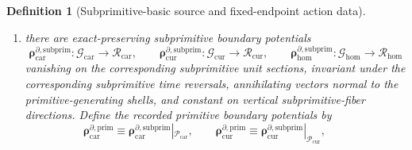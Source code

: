 \documentclass[11pt]{article}
\newcommand{\TensorDensityClass}{\mathscr N_{\mathrm{car}}}
\newcommand{\CurDensityClass}{\mathscr N_{\mathrm{cur}}}
\newcommand{\HomDensityClass}{\mathscr N_{\mathrm{hom}}}
\newcommand{\TensorFluxClass}{\mathscr J_{\mathrm{car}}}
\newcommand{\CurFluxClass}{\mathscr J_{\mathrm{cur}}}
\newcommand{\HomFluxClass}{\mathscr J_{\mathrm{hom}}}
\newcommand{\TensorPhaseReadClass}{\mathscr R_{\mathrm{car}}}
\newcommand{\CurPhaseReadClass}{\mathscr R_{\mathrm{cur}}}
\newcommand{\HomPhaseReadClass}{\mathscr R_{\mathrm{hom}}}
\newcommand{\TensorPrimitiveSpace}{\mathcal P_{\mathrm{car}}}
\newcommand{\CurPrimitiveSpace}{\mathcal P_{\mathrm{cur}}}
\newcommand{\HomPrimitiveSpace}{\mathcal P_{\mathrm{hom}}}
\newcommand{\TensorPrimitiveDensitySource}{\boldsymbol{q}_{\mathrm{car}}^{\mathrm{prim}}}
\newcommand{\CurPrimitiveDensitySource}{\boldsymbol{q}_{\mathrm{cur}}^{\mathrm{prim}}}
\newcommand{\HomPrimitiveDensitySource}{\boldsymbol{q}_{\mathrm{hom}}^{\mathrm{prim}}}
\newcommand{\TensorPrimitiveFluxSource}{\boldsymbol{j}_{\mathrm{car}}^{\mathrm{prim}}}
\newcommand{\CurPrimitiveFluxSource}{\boldsymbol{j}_{\mathrm{cur}}^{\mathrm{prim}}}
\newcommand{\HomPrimitiveFluxSource}{\boldsymbol{j}_{\mathrm{hom}}^{\mathrm{prim}}}
\newcommand{\TensorPrimitiveBoundarySource}{\boldsymbol{\rho}_{\mathrm{car}}^{\partial,\mathrm{prim}}}
\newcommand{\CurPrimitiveBoundarySource}{\boldsymbol{\rho}_{\mathrm{cur}}^{\partial,\mathrm{prim}}}
\newcommand{\TensorSubprimitiveSpace}{\mathcal G_{\mathrm{car}}}
\newcommand{\CurSubprimitiveSpace}{\mathcal G_{\mathrm{cur}}}
\newcommand{\HomSubprimitiveSpace}{\mathcal G_{\mathrm{hom}}}
\newcommand{\TensorSubprimitiveDensitySource}{\boldsymbol{q}_{\mathrm{car}}^{\mathrm{subprim}}}
\newcommand{\CurSubprimitiveDensitySource}{\boldsymbol{q}_{\mathrm{cur}}^{\mathrm{subprim}}}
\newcommand{\HomSubprimitiveDensitySource}{\boldsymbol{q}_{\mathrm{hom}}^{\mathrm{subprim}}}
\newcommand{\TensorSubprimitiveFluxSource}{\boldsymbol{j}_{\mathrm{car}}^{\mathrm{subprim}}}
\newcommand{\CurSubprimitiveFluxSource}{\boldsymbol{j}_{\mathrm{cur}}^{\mathrm{subprim}}}
\newcommand{\HomSubprimitiveFluxSource}{\boldsymbol{j}_{\mathrm{hom}}^{\mathrm{subprim}}}
\newcommand{\TensorSubprimitiveBoundarySource}{\boldsymbol{\rho}_{\mathrm{car}}^{\partial,\mathrm{subprim}}}
\newcommand{\CurSubprimitiveBoundarySource}{\boldsymbol{\rho}_{\mathrm{cur}}^{\partial,\mathrm{subprim}}}
\newcommand{\HomSubprimitiveBoundarySource}{\boldsymbol{\rho}_{\mathrm{hom}}^{\partial,\mathrm{subprim}}}
\newtheorem{definition}{Definition}
\begin{document}
\begin{definition}[Subprimitive-basic source and fixed-endpoint action data]
\begin{enumerate}
    \[
    \TensorSubprimitiveDensitySource:\TensorSubprimitiveSpace\to\TensorDensityClass,\qquad
    \CurSubprimitiveDensitySource:\CurSubprimitiveSpace\to\CurDensityClass,\qquad
    \HomSubprimitiveDensitySource:\HomSubprimitiveSpace\to\HomDensityClass,
    \]
    \[
    \TensorSubprimitiveFluxSource:\TensorSubprimitiveSpace\to\TensorFluxClass,\qquad
    \CurSubprimitiveFluxSource:\CurSubprimitiveSpace\to\CurFluxClass,\qquad
    \HomSubprimitiveFluxSource:\HomSubprimitiveSpace\to\HomFluxClass,
    \]
    invariant under the corresponding subprimitive time reversals, preserved along the current primitive characteristic curves, and constant on primitive-shell-normal directions and on vertical subprimitive-fiber directions. Define the recorded primitive density and primitive flux source fields by restriction:
    \begin{equation}
    \TensorPrimitiveDensitySource\equiv\TensorSubprimitiveDensitySource|_{\TensorPrimitiveSpace},\qquad
    \CurPrimitiveDensitySource\equiv\CurSubprimitiveDensitySource|_{\CurPrimitiveSpace},\qquad
    \HomPrimitiveDensitySource\equiv\HomSubprimitiveDensitySource|_{\HomPrimitiveSpace},
    \label{eq:primitive_density_from_subprimitive}
    \end{equation}
    \begin{equation}
    \TensorPrimitiveFluxSource\equiv\TensorSubprimitiveFluxSource|_{\TensorPrimitiveSpace},\qquad
    \CurPrimitiveFluxSource\equiv\CurSubprimitiveFluxSource|_{\CurPrimitiveSpace},\qquad
    \HomPrimitiveFluxSource\equiv\HomSubprimitiveFluxSource|_{\HomPrimitiveSpace}.
    \label{eq:primitive_flux_from_subprimitive}
    \end{equation}
    \item there are exact-preserving subprimitive boundary potentials
    \[
    \TensorSubprimitiveBoundarySource:\TensorSubprimitiveSpace\to\TensorPhaseReadClass,\qquad
    \CurSubprimitiveBoundarySource:\CurSubprimitiveSpace\to\CurPhaseReadClass,\qquad
    \HomSubprimitiveBoundarySource:\HomSubprimitiveSpace\to\HomPhaseReadClass
    \]
    vanishing on the corresponding subprimitive unit sections, invariant under the corresponding subprimitive time reversals, annihilating vectors normal to the primitive-generating shells, and constant on vertical subprimitive-fiber directions. Define the recorded primitive boundary potentials by
    \begin{equation}
    \TensorPrimitiveBoundarySource\equiv\TensorSubprimitiveBoundarySource|_{\TensorPrimitiveSpace},\qquad
    \CurPrimitiveBoundarySource\equiv\CurSubprimitiveBoundarySource|_{\CurPrimitiveSpace},\qquad

\end{equation}
\end{enumerate}
\end{definition}
\end{document}
